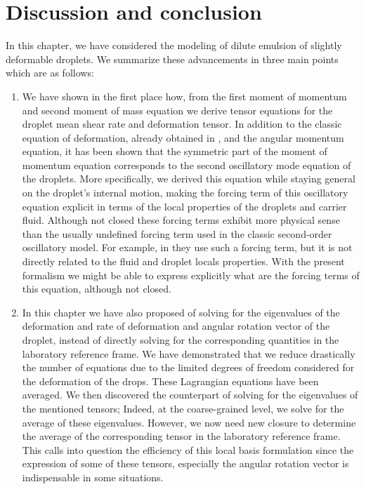 \section{Discussion and conclusion}

In this chapter, we have considered the modeling of dilute emulsion of slightly deformable droplets. 
We summarize these advancements in three main points which are as follows: 
\begin{enumerate}
    \item We have shown in the first place how, from the first moment of momentum and second moment of mass equation we derive tensor equations for the droplet mean shear rate and deformation tensor. 
In addition to the classic equation of deformation, already obtained in \citet{goddard1967nonlinear},  and the angular momentum equation, it has been shown that the symmetric part of the moment of momentum equation corresponds to the second oscillatory mode equation of the droplets. 
More specifically, we derived this equation while staying general on the droplet's internal motion, making the forcing term of this oscillatory equation explicit in terms of the local properties of the droplets and carrier fluid. 
Although not closed these forcing terms exhibit more physical sense than the usually undefined forcing term used in the classic second-order oscillatory model.
For example, in \citet{riviere2021sub} they use such a forcing term, but it is not directly related to the fluid and droplet locals properties.
With the present formalism we might be able to express explicitly what are the forcing terms of this equation, although not closed. 

\item 
In this chapter we have also proposed of solving for the eigenvalues of the deformation and rate of deformation and angular rotation vector of the droplet, instead of directly solving for the corresponding quantities in the laboratory reference frame. 
We have demonstrated that we reduce drastically the number of equations due to the limited degrees of freedom considered for the deformation of the drops. 
These Lagrangian equations have been averaged. 
We then discovered the counterpart of solving for the eigenvalues of the mentioned tensors; 
Indeed, at the coarse-grained level, we solve for the average of these eigenvalues. 
However, we now need new closure to determine the average of the corresponding tensor in the laboratory reference frame.  
This calls into question the efficiency of this local basis formulation since the expression of some of these tensors, especially the angular rotation vector is indispensable in some situations. 


\end{enumerate}
